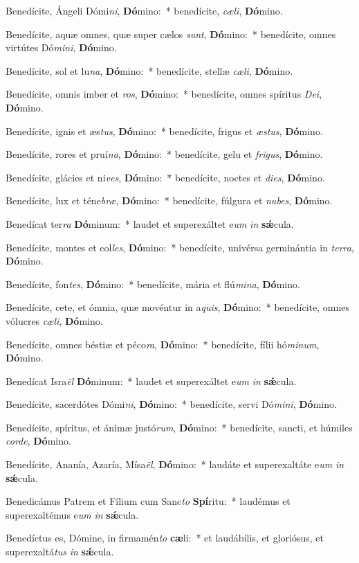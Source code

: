 \item Benedícite, Ángeli Dómi\textit{ni}, \textbf{Dó}mino:~* benedícite, \textit{cæ}\textit{li}, \textbf{Dó}mino.
\item Benedícite, aquæ omnes, quæ super cælos \textit{sunt}, \textbf{Dó}mino:~* benedícite, omnes virtútes Dó\textit{mi}\textit{ni}, \textbf{Dó}mino.
\item Benedícite, sol et lu\textit{na}, \textbf{Dó}mino:~* benedícite, stellæ \textit{cæ}\textit{li}, \textbf{Dó}mino.
\item Benedícite, omnis imber et \textit{ros}, \textbf{Dó}mino:~* benedícite, omnes spíritus \textit{De}\textit{i}, \textbf{Dó}mino.
\item Benedícite, ignis et æs\textit{tus}, \textbf{Dó}mino:~* benedícite, frigus et \textit{æs}\textit{tus}, \textbf{Dó}mino.
\item Benedícite, rores et pruí\textit{na}, \textbf{Dó}mino:~* benedícite, gelu et \textit{fri}\textit{gus}, \textbf{Dó}mino.
\item Benedícite, glácies et ni\textit{ves}, \textbf{Dó}mino:~* benedícite, noctes et \textit{di}\textit{es}, \textbf{Dó}mino.
\item Benedícite, lux et téne\textit{bræ}, \textbf{Dó}mino:~* benedícite, fúlgura et \textit{nu}\textit{bes}, \textbf{Dó}mino.
\item Benedícat ter\textit{ra} \textbf{Dó}minum:~* laudet et superexáltet e\textit{um} \textit{in} \textbf{sǽ}cula.
\item Benedícite, montes et col\textit{les}, \textbf{Dó}mino:~* benedícite, univérsa germinántia in \textit{ter}\textit{ra}, \textbf{Dó}mino.
\item Benedícite, fon\textit{tes}, \textbf{Dó}mino:~* benedícite, mária et flú\textit{mi}\textit{na}, \textbf{Dó}mino.
\item Benedícite, cete, et ómnia, quæ movéntur in a\textit{quis}, \textbf{Dó}mino:~* benedícite, omnes vólucres \textit{cæ}\textit{li}, \textbf{Dó}mino.
\item Benedícite, omnes béstiæ et péco\textit{ra}, \textbf{Dó}mino:~* benedícite, fílii hó\textit{mi}\textit{num}, \textbf{Dó}mino.
\item Benedícat Isra\textit{ël} \textbf{Dó}minum:~* laudet et superexáltet e\textit{um} \textit{in} \textbf{sǽ}cula.
\item Benedícite, sacerdótes Dómi\textit{ni}, \textbf{Dó}mino:~* benedícite, servi Dó\textit{mi}\textit{ni}, \textbf{Dó}mino.
\item Benedícite, spíritus, et ánimæ justó\textit{rum}, \textbf{Dó}mino:~* benedícite, sancti, et húmiles \textit{cor}\textit{de}, \textbf{Dó}mino.
\item Benedícite, Ananía, Azaría, Mísa\textit{ël}, \textbf{Dó}mino:~* laudáte et superexaltáte e\textit{um} \textit{in} \textbf{sǽ}cula.
\item Benedicámus Patrem et Fílium cum Sanc\textit{to} \textbf{Spí}ritu:~* laudémus et superexaltémus e\textit{um} \textit{in} \textbf{sǽ}cula.
\item Benedíctus es, Dómine, in firmamén\textit{to} \textbf{cæ}li:~* et laudábilis, et gloriósus, et superexaltá\textit{tus} \textit{in} \textbf{sǽ}cula.
